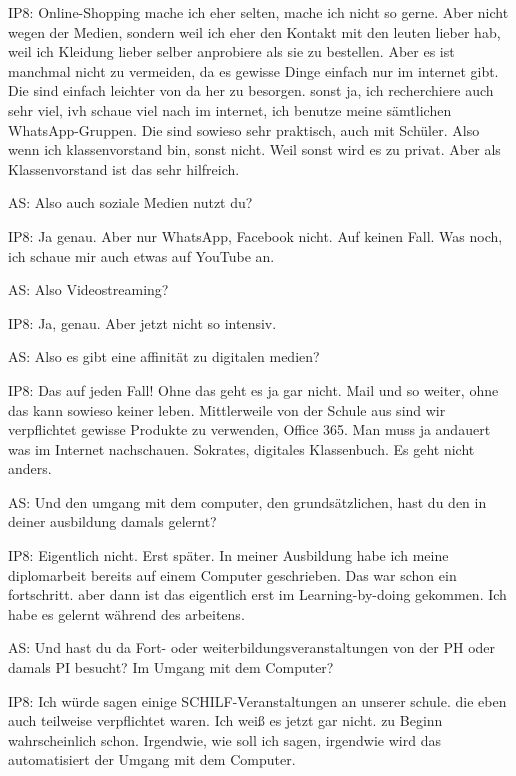 \documentclass[fontsize=11pt,paper=a4]{scrbook}
\begin{document}
{\begin{itemize*}
		\item[IP8:] Online-Shopping mache ich eher selten, mache ich nicht so gerne. Aber nicht wegen der Medien, sondern weil ich eher den Kontakt mit den leuten lieber hab, weil ich Kleidung lieber selber anprobiere als sie zu bestellen.
		Aber es ist manchmal nicht zu
		vermeiden, da es gewisse Dinge einfach
		nur im internet gibt. Die sind einfach
		leichter von da her zu besorgen.
		sonst ja,  ich recherchiere auch sehr
		viel, ivh schaue viel nach im internet, ich benutze
		meine sämtlichen WhatsApp-Gruppen. Die sind sowieso
		sehr praktisch,  auch mit Schüler.
		Also wenn ich klassenvorstand bin, sonst
		nicht. Weil sonst wird es zu privat. Aber als Klassenvorstand ist das sehr hilfreich.
		\item[AS:] Also auch soziale Medien nutzt du?
		\item[IP8:] Ja genau. Aber nur WhatsApp, Facebook nicht. Auf keinen Fall. Was noch, ich schaue mir auch etwas auf YouTube an.
		\item[AS:] Also Videostreaming?
		\item[IP8:] Ja, genau. Aber jetzt nicht so intensiv.
		\item[AS:] Also es gibt eine affinität zu digitalen
		medien?
		\item[IP8:] Das auf jeden Fall! Ohne das geht es ja gar nicht. Mail und so weiter, ohne das kann sowieso keiner leben. Mittlerweile von der Schule aus sind wir verpflichtet gewisse Produkte zu verwenden, Office 365. Man muss ja andauert was im Internet nachschauen. Sokrates,  digitales 	Klassenbuch. Es geht nicht anders.
		\item[AS:] Und den umgang mit dem
		computer, den grundsätzlichen, hast du
		den in deiner ausbildung damals gelernt?
		\item[IP8:] Eigentlich nicht. Erst später. In meiner Ausbildung habe ich meine diplomarbeit bereits auf einem
		Computer geschrieben. Das war schon ein fortschritt.
		aber dann ist das eigentlich erst im Learning-by-doing gekommen. Ich habe es gelernt
		während des arbeitens.
		\item[AS:] Und hast du da
		Fort- oder weiterbildungsveranstaltungen
		von der PH oder damals PI besucht? Im Umgang mit dem Computer?
		\item[IP8:] Ich	würde sagen einige SCHILF-Veranstaltungen an unserer schule. die eben auch teilweise verpflichtet
		waren. Ich weiß es jetzt gar nicht. zu Beginn wahrscheinlich schon. Irgendwie, wie soll ich sagen,
		irgendwie wird das automatisiert der Umgang mit dem Computer.

\end{itemize*}}
\end{document}
